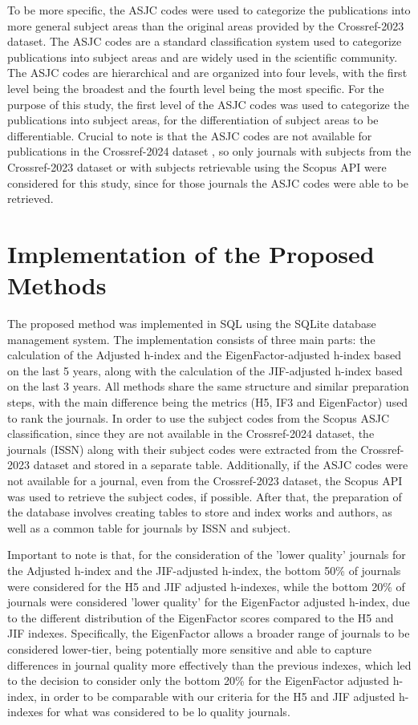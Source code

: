 To be more specific, the ASJC codes were used to categorize the publications
into more general subject areas than the original areas provided by the
Crossref-2023 dataset. The ASJC codes are a standard classification system used
to categorize publications into subject areas and are widely used in the
scientific community. The ASJC codes are hierarchical and are organized into
four levels, with the first level being the broadest and the fourth level being
the most specific. For the purpose of this study, the first level of the ASJC
codes was used to categorize the publications into subject areas, for the differentiation 
of subject areas to be differentiable. Crucial to
note is that the ASJC codes are not available for publications in the
Crossref-2024 dataset \cite{crossrefSubjectCodes2024}, so only journals with
subjects from the Crossref-2023 dataset or with subjects retrievable using the
Scopus API were considered for this study, since for those journals the ASJC
codes were able to be retrieved.

\section{Implementation of the Proposed Methods}

The proposed method was implemented in SQL using the SQLite database management
system. The implementation consists of three main parts: the calculation of the
Adjusted h-index and the EigenFactor-adjusted h-index based on the last 5
years, along with the calculation of the JIF-adjusted h-index based on the last
3 years. All methods share the same structure and similar preparation steps,
with the main difference being the metrics (H5, IF3 and EigenFactor) used to
rank the journals. In order to use the subject codes from the Scopus ASJC
classification, since they are not available in the Crossref-2024 dataset, the
journals (ISSN) along with their subject codes were extracted from the
Crossref-2023 dataset and stored in a separate table. Additionally, if the ASJC
codes were not available for a journal, even from the Crossref-2023 dataset,
the Scopus API was used to retrieve the subject codes, if possible. After that,
the preparation of the database involves creating tables to store and index
works and authors, as well as a common table for journals by ISSN and subject.

Important to note is that, for the consideration of the 'lower quality'
journals for the Adjusted h-index and the JIF-adjusted h-index, the bottom 50\%
of journals were considered for the H5 and JIF adjusted
h-indexes, while the bottom 20\% of journals were considered 'lower quality'
for the EigenFactor adjusted h-index, due to the different distribution of the
EigenFactor scores compared to the H5 and JIF indexes. Specifically, the
EigenFactor allows a broader range of journals to be considered lower-tier,
being potentially more sensitive and able to capture differences in journal
quality more effectively than the previous indexes, which led to the decision to
consider only the bottom 20\% for the EigenFactor adjusted h-index, in order to
be comparable with our criteria for the H5 and JIF adjusted h-indexes for
what was considered to be lo quality journals.

